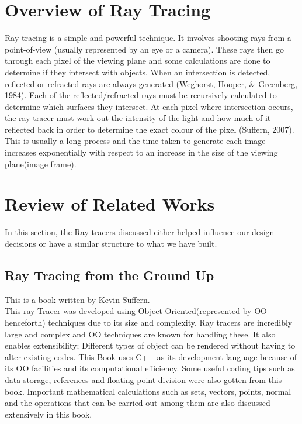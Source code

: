 \documentclass[a4paper]{report}
\begin{document}
	\section{Overview of Ray Tracing}
	\par Ray tracing is a simple and powerful technique. It involves shooting rays from a point-of-view (usually represented by an eye or a camera). These rays then go through each pixel of the viewing plane and some calculations are done to determine if they intersect with objects. When an intersection is detected, reflected or refracted rays are always generated (Weghorst, Hooper, \& Greenberg, 1984). Each of the reflected/refracted rays must be recursively calculated to determine which surfaces they intersect. At each pixel where intersection occurs, the ray tracer must work out the intensity of the light and how much of it reflected back in order to determine the exact colour of the pixel (Suffern, 2007). This is usually a long process and the time taken to generate each image increases exponentially with respect to an increase in the size of the viewing plane(image frame).\\
	
	\section{Review of Related Works}
	\par In this section, the Ray tracers discussed either helped influence our design decisions or have a similar structure to what we have built.
	\subsection{Ray Tracing from the Ground Up}
	\label{sssec:book}
	\par This is a book written by Kevin Suffern.\\
	
	This ray Tracer was developed using Object-Oriented(represented by OO henceforth) techniques due to its size and complexity. Ray tracers are incredibly large and complex and OO techniques are known for handling these. It also enables extensibility; Different types of object can be rendered without having to alter existing codes. This Book uses C++ as its development language because of its OO facilities and its computational efficiency. Some useful coding tips such as data storage, references and floating-point division were also gotten from this book. Important mathematical calculations such as sets, vectors, points, normal and the operations that can be carried out among them are also discussed extensively in this book.\\
	
\end{document}
